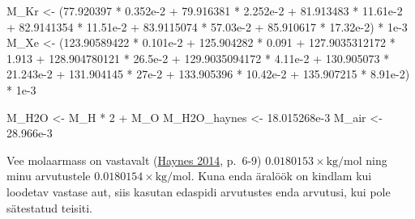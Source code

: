 \documentclass[
  12pt,
  a4paper,
  onecolumn, twoside]{article}
\newenvironment{Shaded}{\begin{snugshade}}{\end{snugshade}}
\newcommand{\DecValTok}[1]{\textcolor[rgb]{0.00,0.00,0.81}{#1}}
\newcommand{\FloatTok}[1]{\textcolor[rgb]{0.00,0.00,0.81}{#1}}
\newcommand{\NormalTok}[1]{#1}
\newcommand{\OtherTok}[1]{\textcolor[rgb]{0.56,0.35,0.01}{#1}}
\newcommand{\SpecialCharTok}[1]{\textcolor[rgb]{0.00,0.00,0.00}{#1}}
\begin{document}
\begin{Shaded}
\begin{Highlighting}[numbers=left,,]
\NormalTok{M\_Kr }\OtherTok{\textless{}{-}}\NormalTok{ (}\FloatTok{77.920397} \SpecialCharTok{*} \FloatTok{0.352e{-}2} \SpecialCharTok{+} \FloatTok{79.916381} \SpecialCharTok{*} \FloatTok{2.252e{-}2} \SpecialCharTok{+} \FloatTok{81.913483} \SpecialCharTok{*} \FloatTok{11.61e{-}2} \SpecialCharTok{+} \FloatTok{82.9141354} \SpecialCharTok{*} \FloatTok{11.51e{-}2} \SpecialCharTok{+} \FloatTok{83.9115074} \SpecialCharTok{*} \FloatTok{57.03e{-}2} \SpecialCharTok{+} \FloatTok{85.910617} \SpecialCharTok{*} \FloatTok{17.32e{-}2}\NormalTok{) }\SpecialCharTok{*} \FloatTok{1e{-}3}
\NormalTok{M\_Xe }\OtherTok{\textless{}{-}}\NormalTok{ (}\FloatTok{123.90589422} \SpecialCharTok{*} \FloatTok{0.101e{-}2} \SpecialCharTok{+} \FloatTok{125.904282} \SpecialCharTok{*} \FloatTok{0.091} \SpecialCharTok{+} \FloatTok{127.9035312172} \SpecialCharTok{*} \FloatTok{1.913} \SpecialCharTok{+} \FloatTok{128.904780121} \SpecialCharTok{*} \FloatTok{26.5e{-}2} \SpecialCharTok{+} \FloatTok{129.9035094172} \SpecialCharTok{*} \FloatTok{4.11e{-}2} \SpecialCharTok{+} \FloatTok{130.905073} \SpecialCharTok{*} \FloatTok{21.243e{-}2} \SpecialCharTok{+} \FloatTok{131.904145} \SpecialCharTok{*} \FloatTok{27e{-}2} \SpecialCharTok{+} \FloatTok{133.905396} \SpecialCharTok{*} \FloatTok{10.42e{-}2} \SpecialCharTok{+} \FloatTok{135.907215} \SpecialCharTok{*} \FloatTok{8.91e{-}2}\NormalTok{) }\SpecialCharTok{*} \FloatTok{1e{-}3}

\NormalTok{M\_H2O }\OtherTok{\textless{}{-}}\NormalTok{ M\_H }\SpecialCharTok{*} \DecValTok{2} \SpecialCharTok{+}\NormalTok{ M\_O}
\NormalTok{M\_H2O\_haynes }\OtherTok{\textless{}{-}} \FloatTok{18.015268e{-}3}
\NormalTok{M\_air }\OtherTok{\textless{}{-}} \FloatTok{28.966e{-}3}
\end{Highlighting}
\end{Shaded}

Vee molaarmass on vastavalt (\protect\hyperlink{ref-haynes_2014_crc}{Haynes 2014}, p.~6-9) \(0.0180153 \times \unit{\kilogram\per\mole}\) ning minu arvutustele \(0.0180154 \times \unit{\kilogram\per\mole}\). Kuna enda äralöök on kindlam kui loodetav vastase aut, siis kasutan edaspidi arvutustes enda arvutusi, kui pole sätestatud teisiti.
\end{document}
